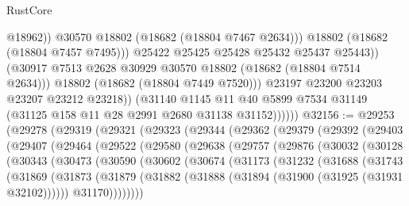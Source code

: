 \begin{lexlean}{RustCore}
\begin{coremodule}
                              @18962))
                          @30570
                          @18802
                          (@18682 (@18804 @7467 @2634)))
                        @18802
                        (@18682 (@18804 @7457 @7495)))
                      @25422
                      @25425
                      @25428
                      @25432
                      @25437
                      @25443))
                  (@30917 @7513 @2628 @30929 @30570 @18802 (@18682 (@18804 @7514 @2634)))
                  @18802
                  (@18682 (@18804 @7449 @7520)))
                @23197
                @23200
                @23203
                @23207
                @23212
                @23218))
            (@31140
              @1145
              @11
              @40
              @5899
              @7534
              @31149
              (@31125 @158 @11 @28 @2991 @2680 @31138 @31152))))))
@32156 := @29253
    (@29278
      (@29319
        (@29321
          (@29323
            (@29344
              (@29362
                (@29379
                  (@29392
                    (@29403
                      (@29407
                        (@29464
                          (@29522
                            (@29580
                              (@29638
                                (@29757
                                  (@29876
                                    (@30032
                                      (@30128
                                        (@30343
                                          (@30473
                                            (@30590
                                              (@30602
                                                (@30674
                                                  (@31173
                                                    (@31232
                                                      (@31688
                                                        (@31743
                                                          (@31869
                                                            (@31873
                                                              (@31879
                                                                (@31882
                                                                  (@31888
                                                                    (@31894
                                                                      (@31900
                                                                        (@31925 (@31931 @32102))))))
                                                                @31170))))))))

\end{coremodule}
\end{lexlean}
